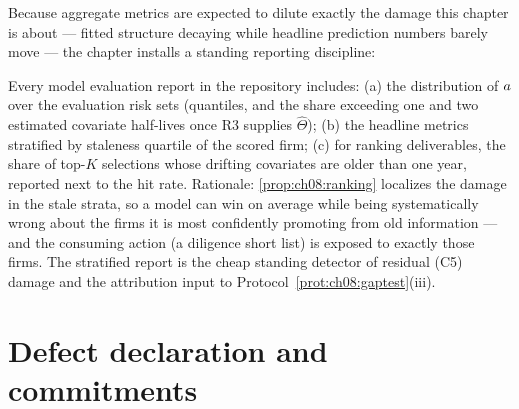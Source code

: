 Because aggregate metrics are expected to dilute exactly the damage this
chapter is about --- fitted structure decaying while headline prediction
numbers barely move --- the chapter installs a standing
reporting discipline:

\begin{protocol}
\label{prot:ch08:account}
Every model evaluation report in the repository includes: (a) the
distribution of $a$ over the evaluation risk sets (quantiles,
and the share exceeding one and two estimated covariate half-lives once
R3 supplies $\hat\Theta$); (b) the headline metrics stratified by
staleness quartile of the scored firm; (c) for ranking deliverables, the
share of top-$K$ selections whose drifting covariates are older than one
year, reported next to the hit rate. Rationale:
\cref{prop:ch08:ranking} localizes the damage in the stale strata, so a
model can win on average while being systematically wrong about the
firms it is most confidently promoting from old information --- and the
consuming action (a diligence short list) is exposed to exactly those
firms. The stratified report is the cheap standing detector of residual
(C5) damage and the attribution input to
Protocol~\ref{prot:ch08:gaptest}(iii).
\end{protocol}

\section{Defect declaration and commitments}\label{ch08:sec:declaration}


